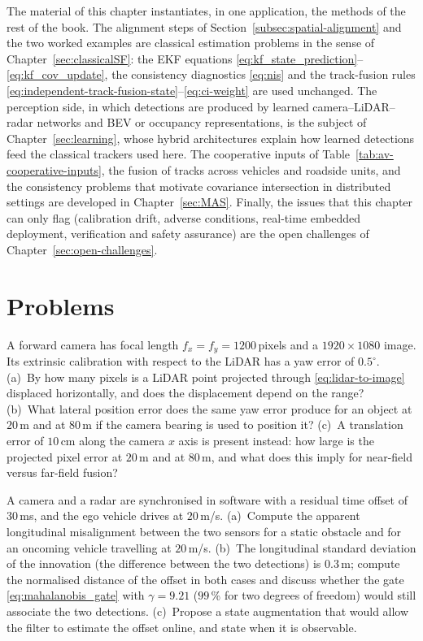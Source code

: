 \documentclass[graybox,envcountchap]{style/SNmono}
\newcommand{\problemsection}{\section*{Problems}\addcontentsline{toc}{section}{Problems}}
\begin{document}
The material of this chapter instantiates, in one application, the methods of the rest of the book. The alignment steps of Section~\ref{subsec:spatial-alignment} and the two worked examples are classical estimation problems in the sense of Chapter~\ref{sec:classicalSF}: the EKF equations \eqref{eq:kf_state_prediction}--\eqref{eq:kf_cov_update}, the consistency diagnostics \eqref{eq:nis} and the track-fusion rules \eqref{eq:independent-track-fusion-state}--\eqref{eq:ci-weight} are used unchanged. The perception side, in which detections are produced by learned camera--LiDAR--radar networks and BEV or occupancy representations, is the subject of Chapter~\ref{sec:learning}, whose hybrid architectures explain how learned detections feed the classical trackers used here. The cooperative inputs of Table~\ref{tab:av-cooperative-inputs}, the fusion of tracks across vehicles and roadside units, and the consistency problems that motivate covariance intersection in distributed settings are developed in Chapter~\ref{sec:MAS}. Finally, the issues that this chapter can only flag (calibration drift, adverse conditions, real-time embedded deployment, verification and safety assurance) are the open challenges of Chapter~\ref{sec:open-challenges}.

\problemsection

\begin{prob}\label{prob:ch05:1}
A forward camera has focal length $f_{x}=f_{y}=1200$\,pixels and a $1920\times1080$ image. Its extrinsic calibration with respect to the LiDAR has a yaw error of $0.5^{\circ}$. (a)~By how many pixels is a LiDAR point projected through \eqref{eq:lidar-to-image} displaced horizontally, and does the displacement depend on the range? (b)~What lateral position error does the same yaw error produce for an object at $20$\,m and at $80$\,m if the camera bearing is used to position it? (c)~A translation error of $10$\,cm along the camera $x$ axis is present instead: how large is the projected pixel error at $20$\,m and at $80$\,m, and what does this imply for near-field versus far-field fusion?
\end{prob}

\begin{prob}\label{prob:ch05:2}
A camera and a radar are synchronised in software with a residual time offset of $30$\,ms, and the ego vehicle drives at $20$\,m/s. (a)~Compute the apparent longitudinal misalignment between the two sensors for a static obstacle and for an oncoming vehicle travelling at $20$\,m/s. (b)~The longitudinal standard deviation of the innovation (the difference between the two detections) is $0.3$\,m; compute the normalised distance of the offset in both cases and discuss whether the gate \eqref{eq:mahalanobis_gate} with $\gamma=9.21$ ($99$\,\% for two degrees of freedom) would still associate the two detections. (c)~Propose a state augmentation that would allow the filter to estimate the offset online, and state when it is observable.
\end{prob}
\end{document}
